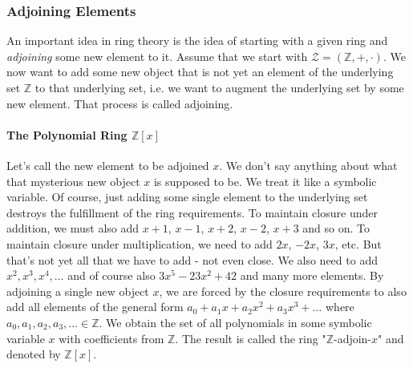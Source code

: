 
\subsubsection{Adjoining Elements}
An important idea in ring theory is the idea of starting with a given ring and \emph{adjoining} some new element to it. Assume that we start with $\mathcal{Z} = (\mathbb{Z},+,\cdot)$. We now want to add some new object that is not yet an element of the underlying set $\mathbb{Z}$ to that underlying set, i.e. we want to augment the underlying set by some new element. That process is called adjoining. 

\paragraph{The Polynomial Ring $\mathbb{Z}[x]$}
Let's call the new element to be adjoined $x$. We don't say anything about what that mysterious new object $x$ is supposed to be. We treat it like a symbolic variable. Of course, just adding some single element to the underlying set destroys the fulfillment of the ring requirements. To maintain closure under addition, we must also add $x+1$, $x-1$, $x+2$, $x-2$, $x+3$ and so on. To maintain closure under multiplication, we need to add $2 x$, $-2 x$, $3 x$, etc. But that's not yet all that we have to add - not even close. We also need to add $x^2, x^3, x^4, \ldots$ and of course also $3 x^5 - 23 x^2 + 42$ and many more elements. By adjoining a single new object $x$, we are forced by the closure requirements to also add all elements of the general form $a_0 + a_1 x + a_2 x^2 + a_3 x^3 + \ldots$ where $a_0, a_1, a_2, a_3, \ldots \in \mathbb{Z}$. We obtain the set of all polynomials in some symbolic variable $x$ with coefficients from $\mathbb{Z}$. The result is called the ring "$\mathbb{Z}$-adjoin-$x$" and denoted by $\mathbb{Z}[x]$.



